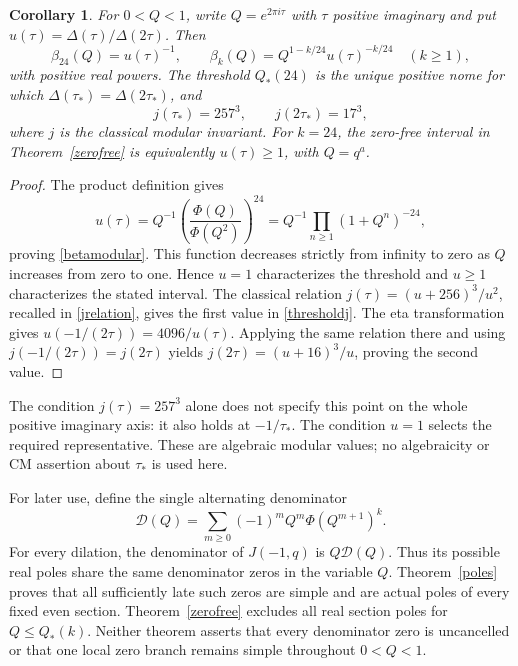 \documentclass[11pt]{amsart}
\newtheorem{corollary}[theorem]{Corollary}
\theoremstyle{definition}
\theoremstyle{remark}
\numberwithin{equation}{section}
\begin{document}
\begin{corollary}\label{modularthreshold}
For $0<Q<1$, write $Q=e^{2\pi i\tau}$ with $\tau$ positive imaginary and put $u(\tau)=\Delta(\tau)/\Delta(2\tau)$. Then
\begin{equation}\label{betamodular}
 \beta_{24}(Q)=u(\tau)^{-1},\qquad
 \beta_k(Q)=Q^{1-k/24}u(\tau)^{-k/24}\quad(k\ge1),
\end{equation}
with positive real powers. The threshold $Q_*(24)$ is the unique positive nome for which $\Delta(\tau_*)=\Delta(2\tau_*)$, and
\begin{equation}\label{thresholdj}
 j(\tau_*)=257^3,\qquad j(2\tau_*)=17^3,
\end{equation}
where $j$ is the classical modular invariant. For $k=24$, the zero-free interval in Theorem~\ref{zerofree} is equivalently $u(\tau)\ge1$, with $Q=q^a$.
\end{corollary}
\begin{proof}
The product definition gives
\[
 u(\tau)=Q^{-1}\left(\frac{\Phi(Q)}{\Phi(Q^2)}\right)^{24}
        =Q^{-1}\prod_{n\ge1}(1+Q^n)^{-24},
\]
proving \eqref{betamodular}. This function decreases strictly from infinity to zero as $Q$ increases from zero to one. Hence $u=1$ characterizes the threshold and $u\ge1$ characterizes the stated interval. The classical relation
$j(\tau)=(u+256)^3/u^2$, recalled in \eqref{jrelation}, gives the first value in \eqref{thresholdj}. The eta transformation gives
$u(-1/(2\tau))=4096/u(\tau)$. Applying the same relation there and using $j(-1/(2\tau))=j(2\tau)$ yields
$j(2\tau)=(u+16)^3/u$, proving the second value.
\end{proof}

The condition $j(\tau)=257^3$ alone does not specify this point on the whole positive imaginary axis: it also holds at $-1/\tau_*$. The condition $u=1$ selects the required representative. These are algebraic modular values; no algebraicity or CM assertion about $\tau_*$ is used here.

For later use, define the single alternating denominator
\begin{equation}\label{commonD}
 \mathcal D(Q)=\sum_{m\ge0}(-1)^m Q^m\Phi(Q^{m+1})^k.
\end{equation}
For every dilation, the denominator of $J(-1,q)$ is $Q\mathcal D(Q)$. Thus its possible real poles share the same denominator zeros in the variable $Q$. Theorem~\ref{poles} proves that all sufficiently late such zeros are simple and are actual poles of every fixed even section. Theorem~\ref{zerofree} excludes all real section poles for $Q\le Q_*(k)$. Neither theorem asserts that every denominator zero is uncancelled or that one local zero branch remains simple throughout $0<Q<1$.
\end{document}

